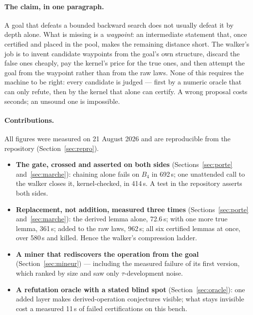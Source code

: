 \documentclass[11pt]{article}
\theoremstyle{remark}\newtheorem{remark}{Remark}
\begin{document}
\paragraph{The claim, in one paragraph.} A goal that defeats a bounded
backward search does not usually defeat it by depth alone. What is missing is
a \emph{waypoint}: an intermediate statement that, once certified and placed
in the pool, makes the remaining distance short. The walker's job is to invent
candidate waypoints from the goal's own structure, discard the false ones
cheaply, pay the kernel's price for the true ones, and then attempt the goal
from the waypoint rather than from the raw laws. None of this requires the
machine to be right: every candidate is judged --- first by a numeric oracle
that can only refute, then by the kernel that alone can certify. A wrong
proposal costs seconds; an unsound one is impossible.

\paragraph{Contributions.} All figures were measured on 21 August 2026 and
are reproducible from the repository (Section~\ref{sec:repro}).
\begin{itemize}
\item \textbf{The gate, crossed and asserted on both sides}
  (Sections~\ref{sec:porte} and~\ref{sec:marche}): chaining alone fails on
  $B_4$ in 692\,s; one unattended call to the walker closes it,
  kernel-checked, in 414\,s. A test in the repository asserts both sides.
\item \textbf{Replacement, not addition, measured three times}
  (Sections~\ref{sec:porte} and~\ref{sec:marche}): the derived lemma alone,
  72.6\,s; with one more true lemma, 361\,s; added to the raw laws, 962\,s;
  all six certified lemmas at once, over 580\,s and killed. Hence the
  walker's compression ladder.
\item \textbf{A miner that rediscovers the operation from the goal}
  (Section~\ref{sec:mineur}) --- including the measured failure of its first
  version, which ranked by size and saw only $\tau$-development noise.
\item \textbf{A refutation oracle with a stated blind spot}
  (Section~\ref{sec:oracle}): one added layer makes derived-operation
  conjectures visible; what stays invisible cost a measured 11\,s of failed
  certifications on this bench.
\end{itemize}

\end{document}
